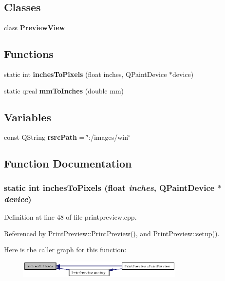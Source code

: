 \subsection*{Classes}
\begin{CompactItemize}
\item 
class {\bf Preview\-View}
\end{CompactItemize}
\subsection*{Functions}
\begin{CompactItemize}
\item 
static int {\bf inches\-To\-Pixels} (float inches, QPaint\-Device $\ast$device)
\item 
static qreal {\bf mm\-To\-Inches} (double mm)
\end{CompactItemize}
\subsection*{Variables}
\begin{CompactItemize}
\item 
const QString {\bf rsrc\-Path} = \char`\"{}:/images/win\char`\"{}
\end{CompactItemize}


\subsection{Function Documentation}
\subsubsection{\setlength{\rightskip}{0pt plus 5cm}static int inches\-To\-Pixels (float {\em inches}, QPaint\-Device $\ast$ {\em device})\hspace{0.3cm}{\tt  [inline, static]}}\label{printpreview_8cpp_fd6bdb40c251834098e7103dae6b7a0f}




Definition at line 48 of file printpreview.cpp.

Referenced by Print\-Preview::Print\-Preview(), and Print\-Preview::setup().

Here is the caller graph for this function:\begin{figure}[H]
\begin{center}
\leavevmode
\includegraphics[width=234pt]{printpreview_8cpp_fd6bdb40c251834098e7103dae6b7a0f_icgraph}
\end{center}
\end{figure}
